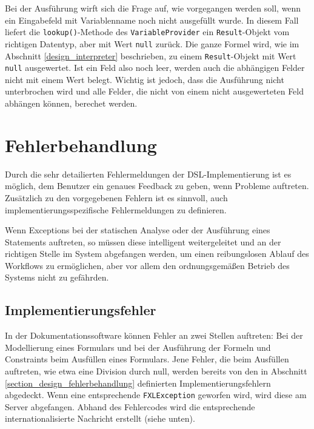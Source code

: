 Bei der Aus\-führ\-ung wirft sich die Frage auf, wie vorgegangen werden soll, wenn ein Eingabefeld mit Variablenname noch nicht ausgefüllt wurde. In diesem Fall liefert die \texttt{lookup()}-Methode des \texttt{VariableProvider} ein \texttt{Result}-Objekt vom richtigen Datentyp, aber mit Wert \texttt{null} zurück. Die ganze Formel wird, wie im Abschnitt \ref{design_interpreter} beschrieben, zu einem \texttt{Result}-Objekt mit Wert \texttt{null} ausgewertet. Ist ein Feld also noch leer, werden auch die abhängigen Felder nicht mit einem Wert belegt. Wichtig ist jedoch, dass die Aus\-führ\-ung nicht unterbrochen wird und alle Felder, die nicht von einem nicht ausgewerteten Feld abhängen können, berechet werden.



\section{Fehlerbehandlung}
\label{integration_fehlerbehandlung}

Durch die sehr detailierten Fehlermeldungen der DSL-Implementierung ist es möglich, dem Benutzer ein genaues Feedback zu geben, wenn Probleme auftreten. Zu\-sätz\-lich zu den vorgegebenen Fehlern ist es sinnvoll, auch implementierungsspezifische Fehlermeldungen zu definieren.

Wenn Exceptions bei der statischen Analyse oder der Aus\-führ\-ung eines Statements auftreten, so müssen diese intelligent weitergeleitet und an der richtigen Stelle im System abgefangen werden, um einen reibungslosen Ablauf des Workflows zu ermöglichen, aber vor allem den ordnungsgemäßen Betrieb des Systems nicht zu gefährden.

\subsection{Implementierungsfehler}

In der Dokumentationssoftware können Fehler an zwei Stellen auftreten: Bei der Modellierung eines Formulars und bei der Aus\-führ\-ung der Formeln und Constraints beim Ausfüllen eines Formulars. Jene Fehler, die beim Ausfüllen auftreten, wie etwa eine Division durch null, werden bereits von den in Abschnitt \ref{section_design_fehlerbehandlung} definierten Implementierungsfehlern abgedeckt. Wenn eine ent\-sprech\-ende \texttt{FXLException} geworfen wird, wird diese am Server abgefangen. Abhand des Fehlercodes wird die ent\-sprech\-ende internationalisierte Nachricht erstellt (siehe unten). 


